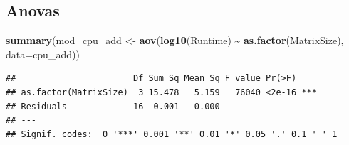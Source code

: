 \documentclass[
]{article}
\newenvironment{Shaded}{\begin{snugshade}}{\end{snugshade}}
\newcommand{\DataTypeTok}[1]{\textcolor[rgb]{0.13,0.29,0.53}{#1}}
\newcommand{\DecValTok}[1]{\textcolor[rgb]{0.00,0.00,0.81}{#1}}
\newcommand{\KeywordTok}[1]{\textcolor[rgb]{0.13,0.29,0.53}{\textbf{#1}}}
\newcommand{\NormalTok}[1]{#1}
\newcommand{\OperatorTok}[1]{\textcolor[rgb]{0.81,0.36,0.00}{\textbf{#1}}}
\newcommand{\StringTok}[1]{\textcolor[rgb]{0.31,0.60,0.02}{#1}}
\begin{document}
\begin{Shaded}
\end{Shaded}

\hypertarget{anovas}{%
\subsection{Anovas}\label{anovas}}

\begin{Shaded}
\begin{Highlighting}[]
\KeywordTok{summary}\NormalTok{(mod\_cpu\_add \textless{}{-}}\StringTok{ }\KeywordTok{aov}\NormalTok{(}\KeywordTok{log10}\NormalTok{(Runtime) }\OperatorTok{\textasciitilde{}}\StringTok{ }\KeywordTok{as.factor}\NormalTok{(MatrixSize), }\DataTypeTok{data=}\NormalTok{cpu\_add))}
\end{Highlighting}
\end{Shaded}

\begin{verbatim}
##                       Df Sum Sq Mean Sq F value Pr(>F)    
## as.factor(MatrixSize)  3 15.478   5.159   76040 <2e-16 ***
## Residuals             16  0.001   0.000                   
## ---
## Signif. codes:  0 '***' 0.001 '**' 0.01 '*' 0.05 '.' 0.1 ' ' 1
\end{verbatim}
\end{document}

